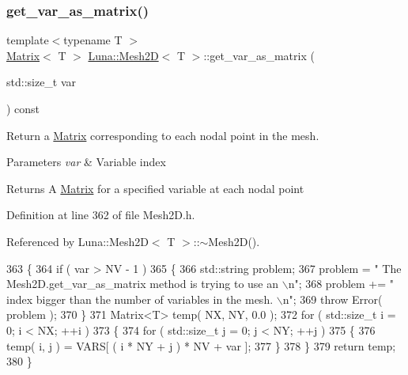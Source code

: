 \subsubsection{\texorpdfstring{get\+\_\+var\+\_\+as\+\_\+matrix()}{get\_var\_as\_matrix()}}
{\footnotesize\ttfamily template$<$typename T $>$ \\
\hyperlink{classLuna_1_1Matrix}{Matrix}$<$ T $>$ \hyperlink{classLuna_1_1Mesh2D}{Luna\+::\+Mesh2D}$<$ T $>$\+::get\+\_\+var\+\_\+as\+\_\+matrix (\begin{DoxyParamCaption}\item[{std\+::size\+\_\+t}]{var }\end{DoxyParamCaption}) const}



Return a \hyperlink{classLuna_1_1Matrix}{Matrix} corresponding to each nodal point in the mesh. 


\begin{DoxyParams}{Parameters}
{\em var} & Variable index \\
\hline
\end{DoxyParams}
\begin{DoxyReturn}{Returns}
A \hyperlink{classLuna_1_1Matrix}{Matrix} for a specified variable at each nodal point 
\end{DoxyReturn}


Definition at line 362 of file Mesh2\+D.\+h.



Referenced by Luna\+::\+Mesh2\+D$<$ T $>$\+::$\sim$\+Mesh2\+D().


\begin{DoxyCode}
363   \{
364     \textcolor{keywordflow}{if} ( var > NV - 1 )
365     \{
366       std::string problem;
367       problem = \textcolor{stringliteral}{" The Mesh2D.get\_var\_as\_matrix method is trying to use an \(\backslash\)n"};
368       problem += \textcolor{stringliteral}{" index bigger than the number of variables in the mesh. \(\backslash\)n"};
369       \textcolor{keywordflow}{throw} Error( problem );
370     \}
371     Matrix<T> temp( NX, NY, 0.0 );
372     \textcolor{keywordflow}{for} ( std::size\_t i = 0; i < NX; ++i )
373     \{
374       \textcolor{keywordflow}{for}  ( std::size\_t j = 0; j < NY; ++j )
375       \{
376         temp( i, j ) = VARS[ ( i * NY + j ) * NV + var ];
377       \}
378     \}
379     \textcolor{keywordflow}{return} temp;
380   \}
\end{DoxyCode}
\mbox{\label{classLuna_1_1Mesh2D_a6c01996a6cafd29b513811de33fd323c}} 
